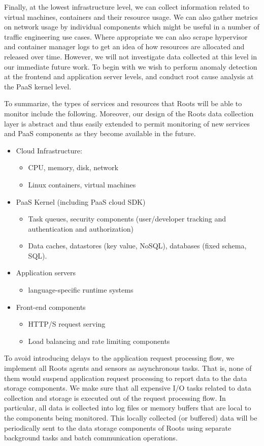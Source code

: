 Finally, at the lowest infrastructure level, we can collect information related to virtual machines, containers
and their resource usage. We can also gather metrics on network usage by individual components which
might be useful in a number of traffic engineering use cases. Where appropriate we can also scrape
hypervisor and container manager logs to get an idea of how resources are allocated and released over
time. However, we will not investigate data collected at this level in our immediate future work.
To begin with we wish to perform anomaly detection at the frontend and application server levels, and conduct
root cause analysis at the PaaS kernel level.

To summarize, the types of services and resources that Roots will be able
to monitor include the following. Moreover, our design of the Roots data collection 
layer is abstract and thus easily extended to permit monitoring of new services 
and PaaS components as they become available in the future.
\begin{itemize}
\item Cloud Infrastructure: 
  \begin{itemize}
  \item CPU, memory, disk, network
  \item Linux containers, virtual machines
  \end{itemize}
\item PaaS Kernel (including PaaS cloud SDK)
  \begin{itemize}
  \item Task queues, security components (user/developer tracking and authentication and authorization)
  \item Data caches, datastores (key value, NoSQL), databases (fixed schema, SQL).
  \end{itemize}
\item Application servers
  \begin{itemize}
  \item language-specific runtime systems
  \end{itemize}
\item Front-end components
  \begin{itemize}
  \item HTTP/S request serving 
  \item Load balancing and rate limiting components
  \end{itemize}
\end{itemize}

To avoid introducing delays to the application request processing flow, we implement
all Roots agents and sensors as asynchronous tasks. That is, none of them would
suspend application request processing to report data to the data storage components.
We make sure that all expensive I/O tasks related to data collection and storage is
executed out of the request processing flow.
In particular, all data is collected into log files or memory buffers that are local to the components being
monitored. This locally collected (or buffered) data will be periodically sent
to the data storage components of Roots using separate background tasks and batch communication
operations.

